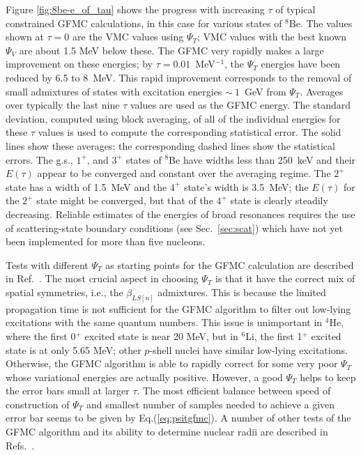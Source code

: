 Figure \ref{fig:8be-e_of_tau} shows the progress with increasing $\tau$
of typical constrained GFMC calculations, in this case for various
states of $^8$Be.  The values shown at $\tau=0$ are the VMC
values using $\Psi_T$; VMC values with the best known $\Psi_V$ are
about 1.5 MeV below these.  The GFMC very rapidly makes a large
improvement on these energies; by $\tau=0.01$~MeV$^{-1}$, the
$\Psi_T$ energies have been reduced by 6.5 to 8~MeV.  This rapid
improvement corresponds to the removal of small admixtures of 
states with excitation energies $\sim~1$~GeV from $\Psi_T$.
Averages over typically the last nine $\tau$ values are
used as the GFMC energy.  The standard deviation, computed using
block averaging, of all of the individual energies for these $\tau$ values
is used to compute the corresponding statistical error.  
The solid lines show these averages; the corresponding dashed lines
show the statistical errors.
The g.s., $1^+$, and $3^+$ states of $^8$Be
have widths less than 250~keV and their $E(\tau)$ appear to be
converged and constant over the averaging regime.  The $2^+$ state
has a width of 1.5~MeV and the $4^+$ state's width is 3.5~MeV;
the $E(\tau)$ for the $2^+$ state might be converged, but that
of the $4^+$ state is clearly steadily decreasing.  Reliable
estimates of the energies of broad resonances requires the use
of scattering-state boundary conditions (see Sec.~\ref{sec:scat}) 
which have not yet been implemented for more than five nucleons.

Tests with different $\Psi_T$ as starting points for
the GFMC calculation are described in Ref.~\cite{PPCPW97}.
The most crucial aspect in choosing $\Psi_T$ is that it have the
correct mix of spatial symmetries, i.e., the $\beta_{LS[n]}$ admixtures.
This is because the limited propagation time is not sufficient for the GFMC
algorithm to filter out low-lying excitations with the same quantum numbers.
This issue is unimportant in $^4$He, where the first 0$^+$ excited state is
near 20 MeV, but in $^6$Li, the first 1$^+$ excited state is at only 5.65 MeV;
other $p$-shell nuclei have similar low-lying excitations.
Otherwise, the GFMC algorithm is able to rapidly correct for some very poor
$\Psi_T$ whose variational energies are actually positive.
However, a good $\Psi_T$ helps to keep the error bars small at larger $\tau$.
The most efficient balance between speed of construction of $\Psi_T$ and
smallest number of samples needed to achieve a given error bar seems to be
given by Eq.(\ref{eq:psitgfmc}).
A number of other tests of the GFMC algorithm and its ability to determine
nuclear radii are described in Refs.~\cite{PPCPW97,WPCP00}.

